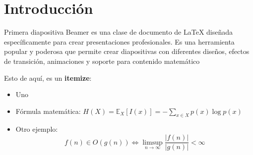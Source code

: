 \section{Introducción}
\label{sec:Introduccion}

\begin{frame}{Primera diapositiva}
Beamer es una clase de documento de LaTeX diseñada específicamente para crear presentaciones profesionales. Es una herramienta popular y poderosa que permite crear diapositivas con diferentes diseños, efectos de transición, animaciones y soporte para contenido matemático

\vspace{0.5cm}

Esto de aquí, es un \textbf{itemize}:

        \begin{itemize}
            \item Uno
            \item Fórmula matemática: \(H(X) = \mathbb{E}_X[I(x)] = -\sum_{x \in X} p(x) \log p(x)\)
            \item Otro ejemplo:
            \[
                f(n) \in O(g(n)) \Leftrightarrow \limsup_{n \rightarrow \infty} \frac{|f(n)|}{|g(n)|} < \infty
            \]
        \end{itemize}
        
\end{frame}